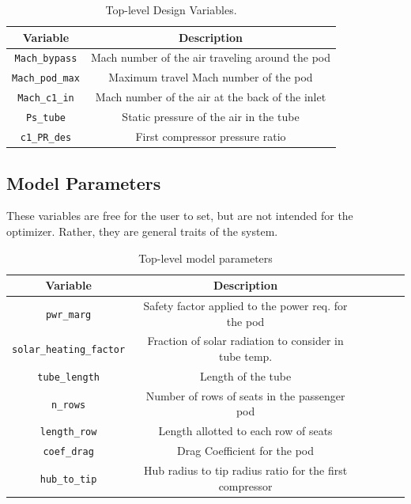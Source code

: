 \documentclass[heading.tex]{subfiles}
\begin{document}
\begin{table} [H]
\centering
\begin{tabular}{|c|c|}
\hline 
Variable & Description\\ 
\hline 
\texttt{Mach\_bypass} & Mach number of the air traveling around the pod \\ 
\hline 
\texttt{Mach\_pod\_max} & Maximum travel Mach number of the pod \\ 
\hline 
\texttt{Mach\_c1\_in} & Mach number of the air at the back of the inlet \\ 
\hline 
\texttt{Ps\_tube} & Static pressure of the air in the tube \\ 
\hline 
\texttt{c1\_PR\_des} & First compressor pressure ratio \\ 
\hline 
\end{tabular}
 \caption[Design Variables]{Top-level Design Variables.}
\end{table}

\subsection{Model Parameters}
These variables are free for the user to set, but are not intended for the optimizer. Rather, they are general traits of the system.

\begin{table} [H]
\centering
\begin{tabular}{|c|c|c|c|c|c|}
\hline 
Variable & Description  \\ 
\hline 
\texttt{pwr\_marg} & Safety factor applied to the power req. for the pod \\ 
\hline 
\texttt{solar\_heating\_factor} & Fraction of solar radiation to consider in tube temp.\\ 
\hline 
\texttt{tube\_length} & Length of the tube  \\ 
\hline 
\texttt{n\_rows} & Number of rows of seats in the passenger pod  \\ 
\hline 
\texttt{length\_row} & Length allotted to each row of seats  \\ 
\hline 
\texttt{coef\_drag} & Drag Coefficient for the pod  \\ 
\hline 
\texttt{hub\_to\_tip} & Hub radius to tip radius ratio for the first compressor \\ 
\hline 
\end{tabular} 
 \caption[Model Parameters]{Top-level model parameters}
\end{table}
\end{document}
